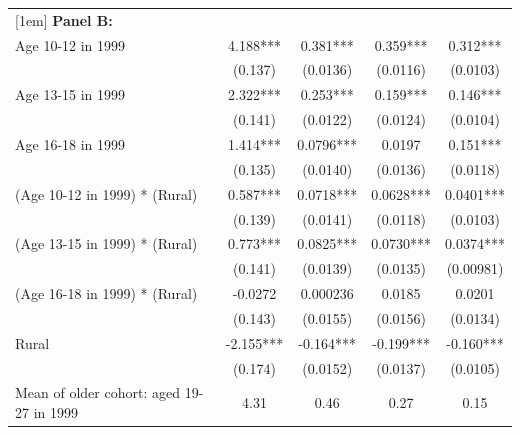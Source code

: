 \documentclass[12pt,letterpaper]{article}
\newcommand{\0}{\ensuremath{\mbox{\boldmath $0$}}}
\begin{document}
\begin{table}[h!]
\begin{center}
{{\begin{tabular}{lcccc}
	[1em]
	{\textbf{Panel B:}}                         &                   &                       &                   &                   \\
	Age 10-12 in 1999                            &       4.188***&       0.381***&       0.359***&       0.312***\\
	                                            &     (0.137)         &    (0.0136)         &    (0.0116)         &    (0.0103)         \\
	[1em]
	Age 13-15 in 1999                            &       2.322***&       0.253***&       0.159***&       0.146***\\
	                                            &     (0.141)         &    (0.0122)         &    (0.0124)         &    (0.0104)         \\
	[1em]
	Age 16-18 in 1999                           &       1.414***&      0.0796***&      0.0197         &       0.151***\\
	                                            &     (0.135)         &    (0.0140)         &    (0.0136)         &    (0.0118)         \\
	[1em]
	(Age 10-12 in 1999) * (Rural)               &     0.587***&      0.0718***&      0.0628***&      0.0401***\\
	                                            &     (0.139)         &    (0.0141)         &    (0.0118)         &    (0.0103)         \\
	[1em]
	(Age 13-15 in 1999) * (Rural)              &       0.773***&      0.0825***&      0.0730***&      0.0374***\\
	                                            &     (0.141)         &    (0.0139)         &    (0.0135)         &   (0.00981)         \\
	[1em]
	(Age 16-18 in 1999) * (Rural)               &     -0.0272         &    0.000236         &      0.0185         &      0.0201         \\
	                                             &     (0.143)         &    (0.0155)         &    (0.0156)         &    (0.0134)         \\
	[1em]
	Rural                                      &      -2.155***&      -0.164***&      -0.199***&      -0.160***\\
	                                           &     (0.174)         &    (0.0152)         &    (0.0137)         &    (0.0105)         \\
	\hline
	Mean of older cohort: aged 19-27 in 1999                  &   4.31            &      0.46     &       0.27        &  0.15                         \\

\end{tabular}}}
\end{center}
\end{table}
\end{document}
